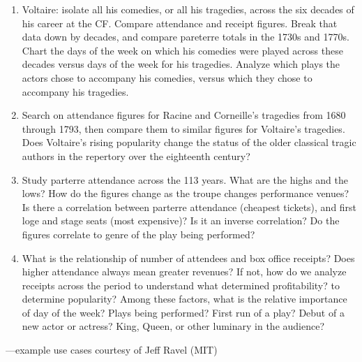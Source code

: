 \documentclass[	DIV=calc,%
							paper=a4,%
							fontsize=11pt,%
							twocolumn]{scrartcl}	 					%
\begin{document}
\begin{framefloat}
  \fontsize{9pt}{9pt}\selectfont
	\begin{enumerate}[align=left]
	  \item Voltaire: isolate all his comedies, or all his tragedies, across the six decades of his career at the CF. Compare attendance and receipt figures. Break that data down by decades, and compare pareterre totals in the 1730s and 1770s. Chart the days of the week on which his comedies were played across these decades versus days of the week for his tragedies. Analyze which plays the actors chose to accompany his comedies, versus which they chose to accompany his tragedies.

		\item Search on attendance figures for Racine and Corneille's tragedies from 1680 through 1793, then compare them to similar figures for Voltaire's tragedies. Does Voltaire's rising popularity change the status of the older classical tragic authors in the repertory over the eighteenth century?

	  \item Study parterre attendance across the 113 years. What are the highs and the lows? How do the figures change as the troupe changes performance venues? Is there a correlation between parterre attendance (cheapest tickets), and first loge and stage seats (most expensive)? Is it an inverse correlation? Do the figures correlate to genre of the play being performed?

	  \item What is the relationship of number of attendees and box office receipts? Does higher attendance always mean greater revenues? If not, how do we analyze receipts across the period to understand what determined profitability? to determine popularity? Among these factors, what is the relative importance of day of the week? Plays being performed? First run of a play? Debut of a new actor or actress? King, Queen, or other luminary in the audience?
  \end{enumerate}
  \hfill —example use cases courtesy of Jeff Ravel (MIT)
\end{framefloat}
\end{document}
